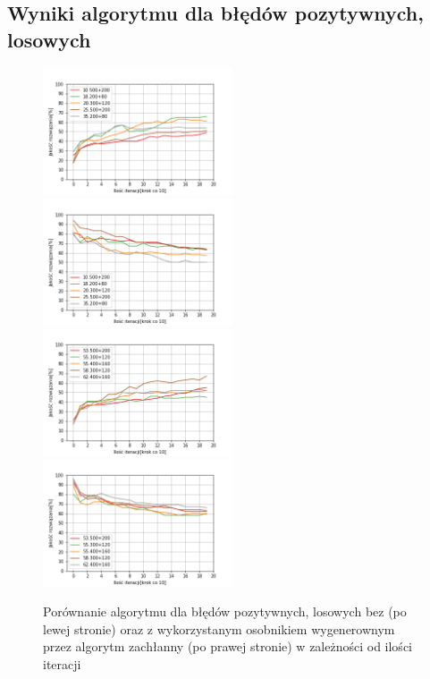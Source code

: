 \documentclass{article}
\begin{document}
\subsection{Wyniki algorytmu dla błędów pozytywnych, losowych}
\begin{figure}[H]
\includegraphics[width=0.5\textwidth]{poz-los1.png}
\includegraphics[width=0.5\textwidth]{poz-los-greedy1.png}
\includegraphics[width=0.5\textwidth]{poz-los2.png}
\includegraphics[width=0.5\textwidth]{poz-los-greedy2.png}
\caption{Porównanie algorytmu dla błędów pozytywnych, losowych bez (po lewej stronie) oraz z wykorzystanym osobnikiem wygenerownym przez algorytm zachłanny (po prawej stronie) w zależności od ilości iteracji}
\end{figure}
\end{document}
